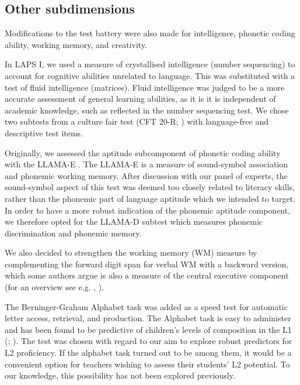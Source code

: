 \documentclass[output=paper]{langsci/langscibook}
\begin{document}
 \subsection{Other subdimensions}

Modifications to the test battery were also made for intelligence, phonetic coding ability, working memory, and creativity. 

In LAPS I, we used a measure of crystallised intelligence (number sequencing) to account for cognitive abilities unrelated to language. This was substituted with a test of fluid intelligence (matrices). Fluid intelligence was judged to be a more accurate assessment of general learning abilities, as it is it is independent of academic knowledge, such as reflected in the number sequencing test. We chose two subtests from a culture fair test (CFT 20-R; \citealt{Weiss2006}) with language-free and descriptive test items.

Originally, we assessed the aptitude subcomponent of phonetic coding ability with the LLAMA-E \citep{MearaEtAl2001}. The LLAMA-E is a measure of sound-symbol association and phonemic working memory. After discussion with our panel of experts, the sound-symbol aspect of this test was deemed too closely related to literacy skills, rather than the phonemic part of language aptitude which we intended to target. In order to have a more robust indication of the phonemic aptitude component, we therefore opted for the LLAMA-D subtest \citep{MearaEtAl2001} which measures phonemic discrimination and phonemic memory. 

We also decided to strengthen the working memory (WM) measure by complementing the forward digit span for verbal WM with a backward version, which some authors argue is also a measure of the central executive component (for an overview see e.g. \citealt{St-ClairEtAl2013}, \citealt{HilbertEtAl2014}). 

The Berninger-Graham Alphabet task \citep{BerningerEtAl1992} was added as a speed test for automatic letter access, retrieval, and production. The Alphabet task is easy to administer and has been found to be predictive of children’s levels of composition in the L1 (\citealt{BerningerEtAl1997}; \citealt{GrahamEtAl2006}). The test was chosen with regard to our aim to explore robust predictors for L2 proficiency. If the alphabet task turned out to be among them, it would be a convenient option for teachers wishing to assess their students’ L2 potential. To our knowledge, this possibility has not been explored previously.
\end{document}
